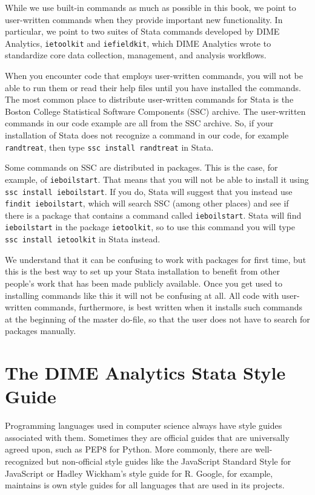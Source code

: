 While we use built-in commands as much as possible in this book,
we point to user-written commands when they provide important new functionality.
In particular, we point to two suites of Stata commands developed by DIME Analytics,
\texttt{ietoolkit} and
\texttt{iefieldkit},
which DIME Analytics wrote to standardize 
core data collection, management, and analysis workflows.

When you encounter code that employs user-written commands,
you will not be able to run them or read their help files 
until you have installed the commands.
The most common place to distribute user-written commands for Stata
is the Boston College Statistical Software Components (SSC) archive.
The user-written commands in our code example are all from the SSC archive.
So, if your installation of Stata does not recognize a command in our code, for example
\texttt{randtreat}, then type \texttt{ssc install randtreat} in Stata.

Some commands on SSC are distributed in packages.
This is the case, for example, of \texttt{ieboilstart}.
That means that you will not be able to install it using \texttt{ssc install ieboilstart}.
If you do, Stata will suggest that you instead use \texttt{findit ieboilstart},
which will search SSC (among other places) and see if there is a
package that contains a command called \texttt{ieboilstart}.
Stata will find \texttt{ieboilstart} in the package \texttt{ietoolkit},
so to use this command you will type \texttt{ssc install ietoolkit} in Stata instead.

We understand that it can be confusing to work with packages for first time,
but this is the best way to set up your Stata installation to benefit from other
people's work that has been made publicly available.
Once you get used to installing commands like this it will not be confusing at all.
All code with user-written commands, furthermore, is best written when it installs such commands
at the beginning of the master do-file,
so that the user does not have to search for packages manually.

\section{The DIME Analytics Stata Style Guide}

Programming languages used in computer science 
always have style guides associated with them.
Sometimes they are official guides that are universally agreed upon, 
such as PEP8 for Python. 
More commonly, there are well-recognized but
non-official style guides like the JavaScript Standard Style 
for JavaScript or Hadley Wickham's style guide for R.
Google, for example, maintains is own style guides for all languages
that are used in its projects.

